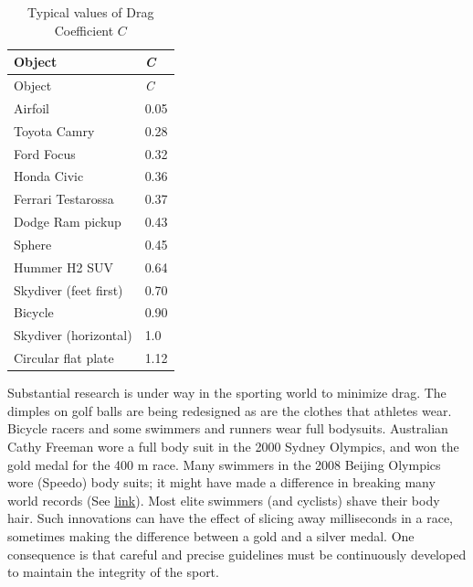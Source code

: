 \documentclass[
]{book}
\begin{document}
\begin{longtable}[]{@{}ll@{}}
\caption{{Typical values of Drag Coefficient \(C{}\)}}\tabularnewline
\toprule
Object & \emph{C} \\
\midrule
\endfirsthead
\toprule
Object & \emph{C} \\
\midrule
\endhead
Airfoil & 0.05 \\
Toyota Camry & 0.28 \\
Ford Focus & 0.32 \\
Honda Civic & 0.36 \\
Ferrari Testarossa & 0.37 \\
Dodge Ram pickup & 0.43 \\
Sphere & 0.45 \\
Hummer H2 SUV & 0.64 \\
Skydiver (feet first) & 0.70 \\
Bicycle & 0.90 \\
Skydiver (horizontal) & 1.0 \\
Circular flat plate & 1.12 \\
\bottomrule
\end{longtable}

Substantial research is under way in the sporting world to minimize
drag. The dimples on golf balls are being redesigned as are the clothes
that athletes wear. Bicycle racers and some swimmers and runners wear
full bodysuits. Australian Cathy Freeman wore a full body suit in the
2000 Sydney Olympics, and won the gold medal for the 400 m race. Many
swimmers in the 2008 Beijing Olympics wore (Speedo) body suits; it might
have made a difference in breaking many world records (See
\protect\hyperlink{import-auto-id1165298678773}{link}). Most
elite swimmers (and cyclists) shave their body hair. Such innovations
can have the effect of slicing away milliseconds in a race, sometimes
making the difference between a gold and a silver medal. One consequence
is that careful and precise guidelines must be continuously developed to
maintain the integrity of the sport.
\end{document}
